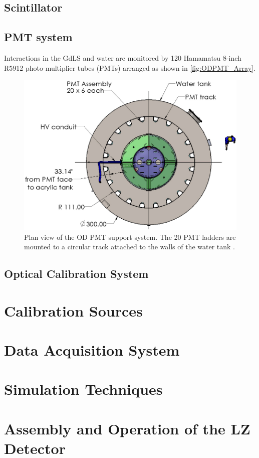 \subsection{Scintillator}

\subsection{PMT system}
Interactions in the GdLS and water are monitored by 120 Hamamatsu 8-inch R5912 photo-multiplier tubes (PMTs) arranged as shown in \autoref{fig:ODPMT_Array}. \cite{HamamatsuR5912}


\begin{figure}
    \centering
    \includegraphics[width=0.5\linewidth]{figures/LZ/OD_PMT_support.jpg}
    \caption{Plan view of the OD PMT support system. The 20 PMT ladders are mounted to a circular track attached to the walls of the water tank \cite{LZTDR}.}
    \label{fig:ODPMT_Array}
\end{figure}

\subsection{Optical Calibration System}

\section{Calibration Sources}

\section{Data Acquisition System}

\section{Simulation Techniques}

\section{Assembly and Operation of the LZ Detector}
